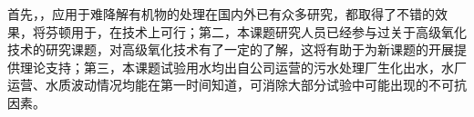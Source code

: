 首先，，应用于难降解有机物的处理在国内外已有众多研究，都取得了不错的效果，将芬顿用于\showproject，在技术上可行；第二，本课题研究人员已经参与过关于高级氧化技术的研究课题，对高级氧化技术有了一定的了解，这将有助于为新课题的开展提供理论支持；第三，本课题试验用水均出自公司运营的污水处理厂生化出水，水厂运营、水质波动情况均能在第一时间知道，可消除大部分试验中可能出现的不可抗因素。